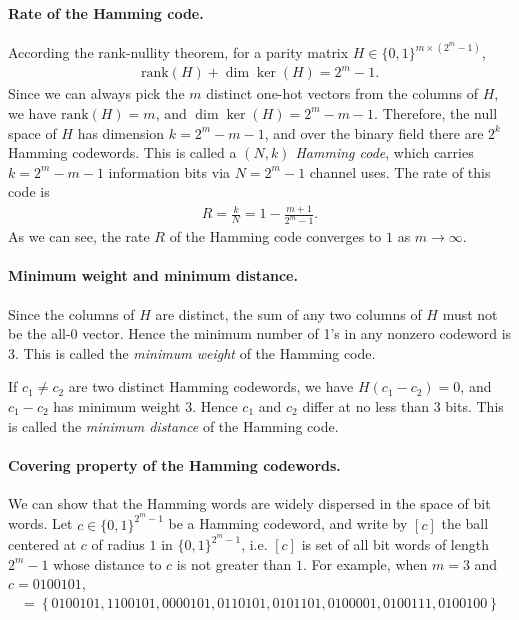\documentclass{article}
\numberwithin{equation}{section}
\theoremstyle{plain}
\theoremstyle{definition}
\begin{document}
\paragraph{Rate of the Hamming code.} According the rank-nullity theorem, for a parity matrix $H\in\{0,1\}^{m\times(2^m-1)}$,
\begin{align*}
	\mathrm{rank}(H)+\dim\ker(H)=2^m-1.
\end{align*}
Since we can always pick the $m$ distinct one-hot vectors from the columns of $H$, we have $\mathrm{rank}(H)=m$, and $\dim\ker(H)=2^m-m-1$. Therefore, the null space of $H$ has dimension $k=2^m-m-1$, and over the binary field there are $2^k$ Hamming codewords. This is called a \textit{$(N,k)$ Hamming code}, which carries $k=2^m-m-1$ information bits via $N=2^m-1$ channel uses. The rate of this code is
\begin{align*}
	R=\frac{k}{N}=1-\frac{m+1}{2^m-1}.
\end{align*}
As we can see, the rate $R$ of the Hamming code converges to $1$ as $m\to\infty$.

\paragraph{Minimum weight and minimum distance.}
Since the columns of $H$ are distinct, the sum of any two columns of $H$ must not be the all-0 vector. Hence the minimum number of 1's in any nonzero codeword is 3. This is called the \textit{minimum weight} of the Hamming code.

If $c_1\neq c_2$ are two distinct Hamming codewords, we have $H(c_1-c_2)=0$, and $c_1-c_2$ has minimum weight $3$. Hence $c_1$ and $c_2$ differ at no less than $3$ bits. This is called the \textit{minimum distance} of the Hamming code.

\paragraph{Covering property of the Hamming codewords.} We can show that the Hamming words are widely dispersed in the space of bit words. Let $c\in\{0,1\}^{2^m-1}$ be a Hamming codeword, and write by $[c]$ the ball centered at $c$ of radius $1$ in $\{0,1\}^{2^m-1}$, i.e. $[c]$ is set of all bit words of length $2^m-1$ whose distance to $c$ is not greater than $1$. For example, when $m=3$ and $c=0100101$,
\begin{align*}
	[0100101]=\left\{0100101,1100101,0000101,0110101,0101101,0100001,0100111,0100100\right\}
\end{align*}
\end{document}
